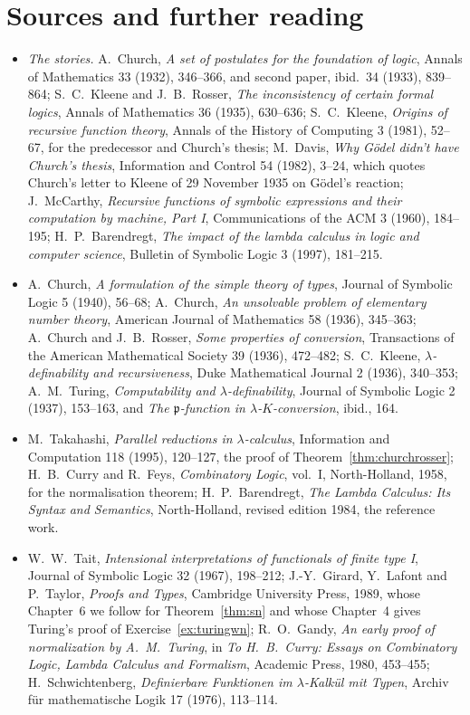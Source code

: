 \section*{Sources and further reading}

\begin{itemize}
\item \emph{The stories.} A.~Church, \emph{A set of postulates for the foundation of logic}, Annals of Mathematics 33 (1932), 346--366, and second paper, ibid.\ 34 (1933), 839--864; S.~C.~Kleene and J.~B.~Rosser, \emph{The inconsistency of certain formal logics}, Annals of Mathematics 36 (1935), 630--636; S.~C.~Kleene, \emph{Origins of recursive function theory}, Annals of the History of Computing 3 (1981), 52--67, for the predecessor and Church's thesis; M.~Davis, \emph{Why Gödel didn't have Church's thesis}, Information and Control 54 (1982), 3--24, which quotes Church's letter to Kleene of 29 November 1935 on Gödel's reaction; J.~McCarthy, \emph{Recursive functions of symbolic expressions and their computation by machine, Part I}, Communications of the ACM 3 (1960), 184--195; H.~P.~Barendregt, \emph{The impact of the lambda calculus in logic and computer science}, Bulletin of Symbolic Logic 3 (1997), 181--215.
\item A.~Church, \emph{A formulation of the simple theory of types}, Journal of Symbolic Logic 5 (1940), 56--68; A.~Church, \emph{An unsolvable problem of elementary number theory}, American Journal of Mathematics 58 (1936), 345--363; A.~Church and J.~B.~Rosser, \emph{Some properties of conversion}, Transactions of the American Mathematical Society 39 (1936), 472--482; S.~C.~Kleene, \emph{$\lambda$-definability and recursiveness}, Duke Mathematical Journal 2 (1936), 340--353; A.~M.~Turing, \emph{Computability and $\lambda$-definability}, Journal of Symbolic Logic 2 (1937), 153--163, and \emph{The $\mathfrak p$-function in $\lambda$-$K$-conversion}, ibid., 164.
\item M.~Takahashi, \emph{Parallel reductions in $\lambda$-calculus}, Information and Computation 118 (1995), 120--127, the proof of Theorem~\ref{thm:churchrosser}; H.~B.~Curry and R.~Feys, \emph{Combinatory Logic}, vol.~I, North-Holland, 1958, for the normalisation theorem; H.~P.~Barendregt, \emph{The Lambda Calculus: Its Syntax and Semantics}, North-Holland, revised edition 1984, the reference work.
\item W.~W.~Tait, \emph{Intensional interpretations of functionals of finite type I}, Journal of Symbolic Logic 32 (1967), 198--212; J.-Y.~Girard, Y.~Lafont and P.~Taylor, \emph{Proofs and Types}, Cambridge University Press, 1989, whose Chapter~6 we follow for Theorem~\ref{thm:sn} and whose Chapter~4 gives Turing's proof of Exercise~\ref{ex:turingwn}; R.~O.~Gandy, \emph{An early proof of normalization by A.~M.~Turing}, in \emph{To H.~B.~Curry: Essays on Combinatory Logic, Lambda Calculus and Formalism}, Academic Press, 1980, 453--455; H.~Schwichtenberg, \emph{Definierbare Funktionen im $\lambda$-Kalkül mit Typen}, Archiv für mathematische Logik 17 (1976), 113--114.

\end{itemize}
